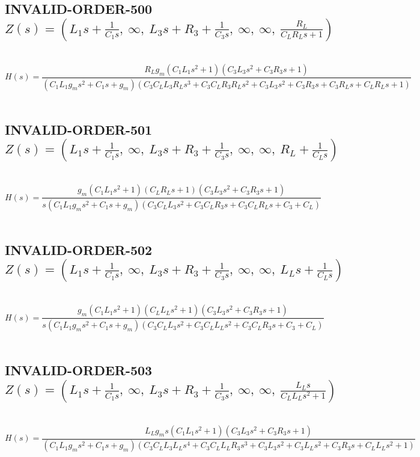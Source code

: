 \documentclass{article}
\begin{document}
\subsection{INVALID-ORDER-500 $Z(s) = \left( L_{1} s + \frac{1}{C_{1} s}, \  \infty, \  L_{3} s + R_{3} + \frac{1}{C_{3} s}, \  \infty, \  \infty, \  \frac{R_{L}}{C_{L} R_{L} s + 1}\right)$ } \ 
\textbf{\[H(s) = \frac{R_{L} g_{m} \left(C_{1} L_{1} s^{2} + 1\right) \left(C_{3} L_{3} s^{2} + C_{3} R_{3} s + 1\right)}{\left(C_{1} L_{1} g_{m} s^{2} + C_{1} s + g_{m}\right) \left(C_{3} C_{L} L_{3} R_{L} s^{3} + C_{3} C_{L} R_{3} R_{L} s^{2} + C_{3} L_{3} s^{2} + C_{3} R_{3} s + C_{3} R_{L} s + C_{L} R_{L} s + 1\right)}\] } \ 
\subsection{INVALID-ORDER-501 $Z(s) = \left( L_{1} s + \frac{1}{C_{1} s}, \  \infty, \  L_{3} s + R_{3} + \frac{1}{C_{3} s}, \  \infty, \  \infty, \  R_{L} + \frac{1}{C_{L} s}\right)$ } \ 
\textbf{\[H(s) = \frac{g_{m} \left(C_{1} L_{1} s^{2} + 1\right) \left(C_{L} R_{L} s + 1\right) \left(C_{3} L_{3} s^{2} + C_{3} R_{3} s + 1\right)}{s \left(C_{1} L_{1} g_{m} s^{2} + C_{1} s + g_{m}\right) \left(C_{3} C_{L} L_{3} s^{2} + C_{3} C_{L} R_{3} s + C_{3} C_{L} R_{L} s + C_{3} + C_{L}\right)}\] } \ 
\subsection{INVALID-ORDER-502 $Z(s) = \left( L_{1} s + \frac{1}{C_{1} s}, \  \infty, \  L_{3} s + R_{3} + \frac{1}{C_{3} s}, \  \infty, \  \infty, \  L_{L} s + \frac{1}{C_{L} s}\right)$ } \ 
\textbf{\[H(s) = \frac{g_{m} \left(C_{1} L_{1} s^{2} + 1\right) \left(C_{L} L_{L} s^{2} + 1\right) \left(C_{3} L_{3} s^{2} + C_{3} R_{3} s + 1\right)}{s \left(C_{1} L_{1} g_{m} s^{2} + C_{1} s + g_{m}\right) \left(C_{3} C_{L} L_{3} s^{2} + C_{3} C_{L} L_{L} s^{2} + C_{3} C_{L} R_{3} s + C_{3} + C_{L}\right)}\] } \ 
\subsection{INVALID-ORDER-503 $Z(s) = \left( L_{1} s + \frac{1}{C_{1} s}, \  \infty, \  L_{3} s + R_{3} + \frac{1}{C_{3} s}, \  \infty, \  \infty, \  \frac{L_{L} s}{C_{L} L_{L} s^{2} + 1}\right)$ } \ 
\textbf{\[H(s) = \frac{L_{L} g_{m} s \left(C_{1} L_{1} s^{2} + 1\right) \left(C_{3} L_{3} s^{2} + C_{3} R_{3} s + 1\right)}{\left(C_{1} L_{1} g_{m} s^{2} + C_{1} s + g_{m}\right) \left(C_{3} C_{L} L_{3} L_{L} s^{4} + C_{3} C_{L} L_{L} R_{3} s^{3} + C_{3} L_{3} s^{2} + C_{3} L_{L} s^{2} + C_{3} R_{3} s + C_{L} L_{L} s^{2} + 1\right)}\] } \ 
\end{document}
